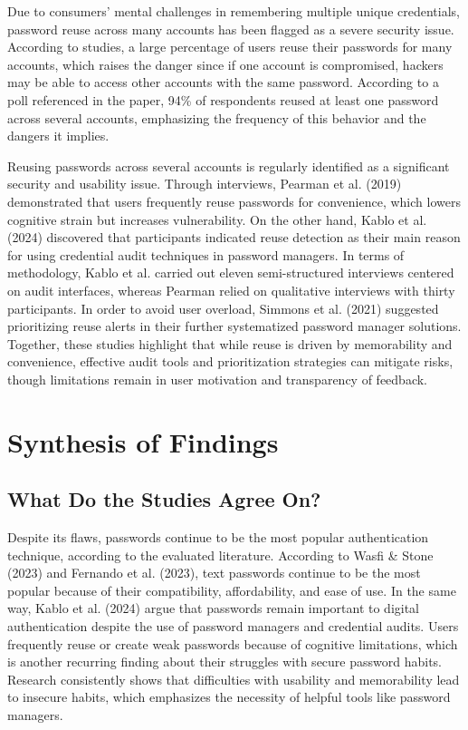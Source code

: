 \documentclass[12pt,a4paper]{article}
\begin{document}
\vspace{0.4cm}

Due to consumers' mental challenges in remembering multiple unique credentials, password reuse across many accounts has been flagged as a severe security issue. According to studies, a large percentage of users reuse their passwords for many accounts, which raises the danger since if one account is compromised, hackers may be able to access other accounts with the same password. According to a poll referenced in the paper, 94\% of respondents reused at least one password across several accounts, emphasizing the frequency of this behavior and the dangers it implies.

\vspace{0.4cm}

Reusing passwords across several accounts is regularly identified as a significant security and usability issue. Through interviews, Pearman et al. (2019) demonstrated that users frequently reuse passwords for convenience, which lowers cognitive strain but increases vulnerability. On the other hand, Kablo et al. (2024) discovered that participants indicated reuse detection as their main reason for using credential audit techniques in password managers. In terms of methodology, Kablo et al. carried out eleven semi-structured interviews centered on audit interfaces, whereas Pearman relied on qualitative interviews with thirty participants. In order to avoid user overload, Simmons et al. (2021) suggested prioritizing reuse alerts in their further systematized password manager solutions. Together, these studies highlight that while reuse is driven by memorability and convenience, effective audit tools and prioritization strategies can mitigate risks, though limitations remain in user motivation and transparency of feedback.


\section{Synthesis of Findings}

\subsection{What Do the Studies Agree On?}

Despite its flaws, passwords continue to be the most popular authentication technique, according to the evaluated literature. According to Wasfi \& Stone (2023) and Fernando et al. (2023), text passwords continue to be the most popular because of their compatibility, affordability, and ease of use. In the same way, Kablo et al. (2024) argue that passwords remain important to digital authentication despite the use of password managers and credential audits. Users frequently reuse or create weak passwords because of cognitive limitations, which is another recurring finding about their struggles with secure password habits. Research consistently shows that difficulties with usability and memorability lead to insecure habits, which emphasizes the necessity of helpful tools like password managers.
\end{document}

